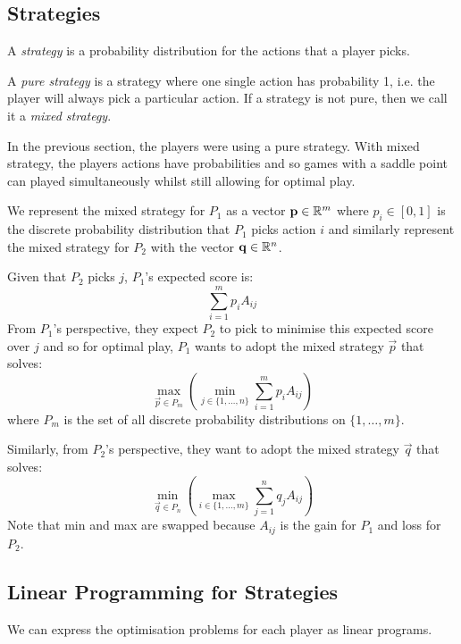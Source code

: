 \documentclass[../main.tex]{subfiles}
\begin{document}
\subsection{Strategies}
\begin{definition}[Strategy]
  A \textit{strategy} is a probability distribution for the actions that a player picks.
\end{definition}
\begin{definition}
  A \textit{pure strategy} is a strategy where one single action has probability 1, i.e. the player will always pick a particular action.
  If a strategy is not pure, then we call it a \textit{mixed strategy}.
\end{definition}
\begin{remark}
  In the previous section, the players were using a pure strategy.
  With mixed strategy, the players actions have probabilities and so games with a saddle point can played simultaneously whilst still allowing for optimal play.
\end{remark}
We represent the mixed strategy for $P_1$ as a vector $\mathbf{\bm{p}} \in \mathbb{R}^{m}$ where $p_i \in [0, 1]$ is the discrete probability distribution that $P_1$ picks action $i$ and similarly represent the mixed strategy for $P_2$ with the vector $\mathbf{\bm{q}} \in \mathbb{R}^{n}$.

Given that $P_2$ picks $j$, $P_1$'s expected score is:
\[
  \sum_{i = 1}^{m} p_i A_{i j}
\]
From $P_1$'s perspective, they expect $P_2$ to pick to minimise this expected score over $j$ and so for optimal play, $P_1$ wants to adopt the mixed strategy $\vec{p}$ that solves:
\begin{equation}
  \max_{\vec{p} \in P_m} \left(\min_{j \in \{1, \ldots, n\}} \sum_{i = 1}^{m} p_i A_{i j}\right) \label{p1prob}
\end{equation}
where $P_m$ is the set of all discrete probability distributions on $\{1, \ldots, m\}$.

Similarly, from $P_2$'s perspective, they want to adopt the mixed strategy $\vec{q}$ that solves:
\[
  \min_{\vec{q} \in P_n} \left(\max_{i \in \{1, \ldots, m\}} \sum_{j = 1}^{n} q_j A_{i j}\right)
\]
Note that min and max are swapped because $A_{i j}$ is the gain for $P_1$ and loss for $P_2$.
\subsection{Linear Programming for Strategies}
We can express the optimisation problems for each player as linear programs.
\end{document}

